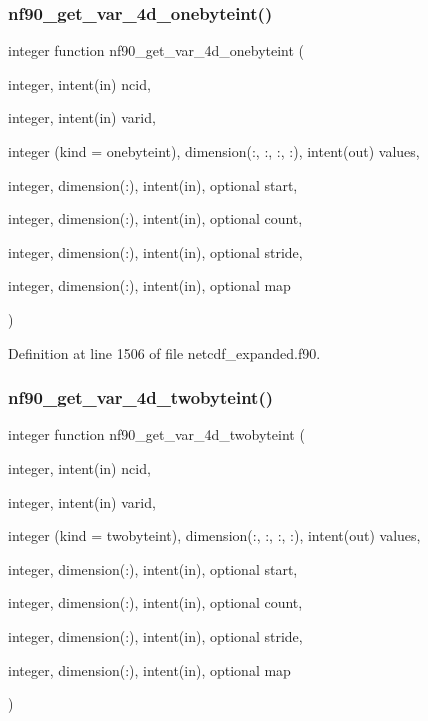 \subsubsection{\texorpdfstring{nf90\+\_\+get\+\_\+var\+\_\+4d\+\_\+onebyteint()}{nf90\_get\_var\_4d\_onebyteint()}}
{\footnotesize\ttfamily integer function nf90\+\_\+get\+\_\+var\+\_\+4d\+\_\+onebyteint (\begin{DoxyParamCaption}\item[{integer, intent(in)}]{ncid,  }\item[{integer, intent(in)}]{varid,  }\item[{integer (kind = onebyteint), dimension(\+:, \+:, \+:, \+:), intent(out)}]{values,  }\item[{integer, dimension(\+:), intent(in), optional}]{start,  }\item[{integer, dimension(\+:), intent(in), optional}]{count,  }\item[{integer, dimension(\+:), intent(in), optional}]{stride,  }\item[{integer, dimension(\+:), intent(in), optional}]{map }\end{DoxyParamCaption})}



Definition at line 1506 of file netcdf\+\_\+expanded.\+f90.

\mbox{\label{netcdf__expanded_8f90_a1cc5680edcbb68a5e70212e488b9cb31}} 
\subsubsection{\texorpdfstring{nf90\+\_\+get\+\_\+var\+\_\+4d\+\_\+twobyteint()}{nf90\_get\_var\_4d\_twobyteint()}}
{\footnotesize\ttfamily integer function nf90\+\_\+get\+\_\+var\+\_\+4d\+\_\+twobyteint (\begin{DoxyParamCaption}\item[{integer, intent(in)}]{ncid,  }\item[{integer, intent(in)}]{varid,  }\item[{integer (kind = twobyteint), dimension(\+:, \+:, \+:, \+:), intent(out)}]{values,  }\item[{integer, dimension(\+:), intent(in), optional}]{start,  }\item[{integer, dimension(\+:), intent(in), optional}]{count,  }\item[{integer, dimension(\+:), intent(in), optional}]{stride,  }\item[{integer, dimension(\+:), intent(in), optional}]{map }\end{DoxyParamCaption})}



